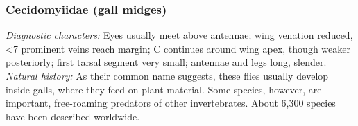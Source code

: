 \documentclass[letterpaper, 11pt]{article}
\begin{document}
\subsubsection{Cecidomyiidae (gall midges)}
\noindent{}\textit{Diagnostic characters:} Eyes usually meet above antennae; wing venation reduced, \textless7 prominent veins reach margin; C continues around wing apex, though weaker posteriorly; first tarsal segment very small; antennae and legs long, slender.\\%

\noindent{}\textit{Natural history:} As their common name suggests, these flies usually develop inside galls, where they feed on plant material. Some species, however, are important, free-roaming predators of other invertebrates. About 6,300 species have been described worldwide.
\end{document}
